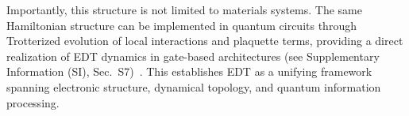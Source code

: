 \documentclass[twocolumn,10pt]{article}
\begin{document}
%

Importantly, this structure is not limited to materials systems. The same Hamiltonian structure can be implemented in quantum circuits through Trotterized evolution of local interactions and plaquette terms, providing a direct realization of EDT dynamics in gate-based architectures (see Supplementary Information (SI), Sec.~S7)~\cite{Lloyd1996,Childs2019,Trotter1959,Suzuki1990}. This establishes EDT as a unifying framework spanning electronic structure, dynamical topology, and quantum information processing.
\end{document}
